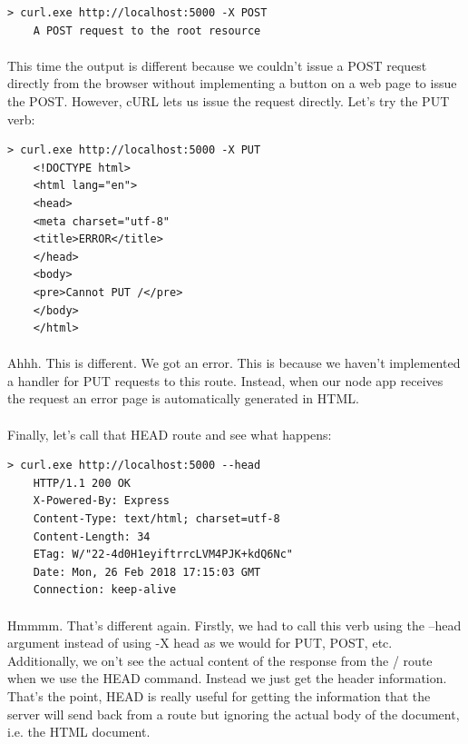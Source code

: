 \documentclass[10pt, a4paper, twosize]{article}
\begin{document}
\begin{lstlisting}[style=DOS]
    > curl.exe http://localhost:5000 -X POST
    A POST request to the root resource
\end{lstlisting}

\paragraph{} This time the output is different because we couldn't issue a POST request directly from the browser without implementing a button on a web page to issue the POST. However, cURL lets us issue the request directly. Let's try the PUT verb:


\begin{lstlisting}[style=DOS]
    > curl.exe http://localhost:5000 -X PUT
    <!DOCTYPE html>
    <html lang="en">
    <head>
    <meta charset="utf-8"
    <title>ERROR</title>
    </head>
    <body>
    <pre>Cannot PUT /</pre>
    </body>
    </html>
\end{lstlisting}

\paragraph{} Ahhh. This is different. We got an error. This is because we haven't implemented a handler for PUT requests to this route. Instead, when our node app receives the request an error page is automatically generated in HTML.

\paragraph{} Finally, let's call that HEAD route and see what happens:

\begin{lstlisting}[style=DOS]
    > curl.exe http://localhost:5000 --head
    HTTP/1.1 200 OK
    X-Powered-By: Express
    Content-Type: text/html; charset=utf-8
    Content-Length: 34
    ETag: W/"22-4d0H1eyiftrrcLVM4PJK+kdQ6Nc"
    Date: Mon, 26 Feb 2018 17:15:03 GMT
    Connection: keep-alive

\end{lstlisting}

\paragraph{} Hmmmm. That's different again. Firstly, we had to call this verb using the --head argument instead of using -X head as we would for PUT, POST, etc. Additionally, we on't see the actual content of the response from the / route when we use the HEAD command. Instead we just get the header information. That's the point, HEAD is really useful for getting the information that the server will send back from a route but ignoring the actual body of the document, i.e. the HTML document. 
\end{document}
